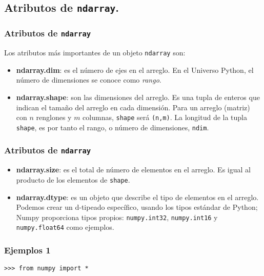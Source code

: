 \documentclass[12pt]{beamer}
\begin{document}
\subsection{Atributos de \texttt{ndarray}.}
\begin{frame}
\frametitle{Atributos de \texttt{ndarray}}
Los atributos m\'{a}s importantes de un objeto \texttt{ndarray} son:
\begin{itemize}
\item \textbf{ndarray.dim}: es el n\'{u}mero de ejes en el arreglo. En el Universo Python, el n\'{u}mero de dimensiones se conoce como \textit{rango}.
\item \textbf{ndarray.shape}: son las dimensiones del arreglo. Es una tupla de enteros que indican el tamaño del arreglo en cada dimensi\'{o}n. Para un arreglo (matriz) con $n$ renglones y $m$ columnas, \texttt{shape} ser\'{a} \texttt{(n,m)}. La longitud de la tupla \texttt{shape}, es por tanto el rango, o n\'{u}mero de dimensiones, \texttt{ndim}.
\end{itemize}
\end{frame}
\begin{frame}
\frametitle{Atributos de \texttt{ndarray}}
\begin{itemize}
\item \textbf{ndarray.size}: es el total de n\'{u}mero de elementos en el arreglo. Es igual al producto de los elementos de \texttt{shape}.
\item \textbf{ndarray.dtype}: es un objeto que describe el tipo de elementos en el arreglo. Podemos crear un d-tipeado espec\'{i}fico, usando los tipos est\'{a}ndar de Python; Numpy proporciona tipos propios: \texttt{numpy.int32}, \texttt{numpy.int16} y \texttt{numpy.float64} como ejemplos.
\end{itemize}
\end{frame}
\begin{frame}[fragile]
\frametitle{Ejemplos 1}
\texttt{>>> from numpy import *} \\
 \\
 \\
\visible<4->{\textcolor{blue}{\texttt{array ([[0,1,2,3,4],}}} \\
 \\
\visible<4->{\hspace{1cm} \textcolor{blue}{[10, 11, 12, 13, 14]])}} \\
\\
\\
\\
\\
\\
\\
\\
\\
\end{frame}
\end{document}
